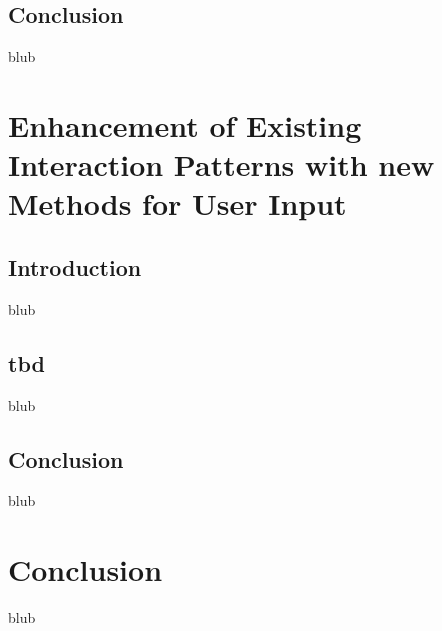 \subsection{Conclusion}

blub




\section{Enhancement of Existing Interaction Patterns with new Methods for User Input}

\label{SectionLiteratureReviewSRQ3}


\subsection{Introduction}

blub



\subsection{tbd}

blub


\subsection{Conclusion}

blub





\section{Conclusion}

\label{SectionLiteratureReviewConclusion}

blub

